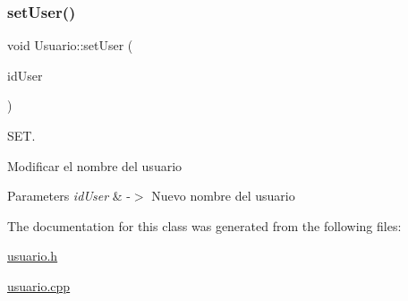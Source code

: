 \subsubsection{\texorpdfstring{set\+User()}{setUser()}}
{\footnotesize\ttfamily void Usuario\+::set\+User (\begin{DoxyParamCaption}\item[{Q\+String}]{id\+User }\end{DoxyParamCaption})}



S\+ET. 

Modificar el nombre del usuario 
\begin{DoxyParams}{Parameters}
{\em id\+User} & -\/$>$ Nuevo nombre del usuario \\
\hline
\end{DoxyParams}


The documentation for this class was generated from the following files\+:\begin{DoxyCompactItemize}
\item 
\mbox{\hyperlink{usuario_8h}{usuario.\+h}}\item 
\mbox{\hyperlink{usuario_8cpp}{usuario.\+cpp}}\end{DoxyCompactItemize}
